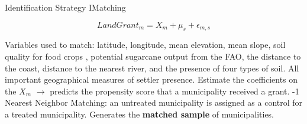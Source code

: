 \documentclass[aspectratio=1610]{beamer}
\begin{document}
\begin{frame}{Identification Strategy I}{Matching}

    \begin{equation}
        LandGrant_m = X_{m} + \mu_s + \epsilon_{m,s}
    \end{equation}
    \vspace{2mm}
    \begin{outline}
        \1 Variables used to match: latitude, longitude, mean elevation, mean slope, soil quality for food crops \parencite{Galor2016-ba}, potential sugarcane output from the FAO, the distance to the coast, distance to the nearest river, and the presence of four types of soil. 
        \vspace{2mm}
            \2 All important geographical measures of settler presence.
        \vspace{2mm}
        \1 Estimate the coefficients on the $X_m$ $\rightarrow$ predicts the propensity score that a municipality received a grant.
        \vspace{2mm}
        -1 Nearest Neighbor Matching: an untreated municipality is assigned as a control for a treated municipality.
        \vspace{2mm}
        \1 Generates the \textbf{matched sample} of municipalities.
    \end{outline}   
\end{frame}

\end{document}
